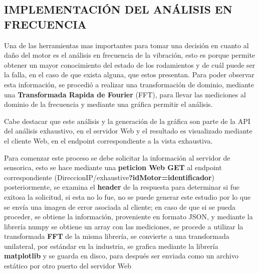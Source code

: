
\subsection{IMPLEMENTACIÓN DEL ANÁLISIS EN FRECUENCIA}

Una de las herramientas mas importantes para tomar una decisión en cuanto
al daño del motor es el análisis en frecuencia de la vibración, esto es porque
permite obtener un mayor conocimiento del estado de los rodamientos y de cuál
puede ser la falla, en el caso de que exista alguna, que estos presentan. Para
poder observar esta información, se procedió a realizar una transformación de
dominio, mediante una \textbf{Transformada Rapida de Fourier} (FFT), para
llevar las mediciones al dominio de la frecuencia
y mediante una gráfica permitir el análisis.

Cabe destacar que este análisis y la generación de la gráfica son parte de la
API del análisis exhaustivo, en el servidor Web y el resultado es visualizado
mediante el cliente Web, en el endpoint correspondiente a la vista exhaustiva.

Para comenzar este proceso se debe  solicitar la información al servidor de
sensorica, esto se hace mediante una \textbf{peticion Web GET} al endpoint
correspondiente (DireccionIP/exhaustive\textbf{?idMotor=identificador}) posteriormente,
se examina el \textbf{header} de la respuesta para determinar si fue exitosa
la solicitud, si esta no lo fue, no se puede generar este estudio por lo que se envía una
imagen de error asociada al cliente; en caso de que si se pueda proceder, se
obtiene la información, proveniente en formato JSON, y mediante la librería
numpy se obtiene un array con las mediciones, se procede a utilizar la transformada
\textbf{FFT} de la misma librería, se convierte a una transformada unilateral,
por estándar en la industria,  se grafica mediante la librería \textbf{matplotlib}
y se guarda en disco, para después ser enviada como un archivo estático por otro
puerto del servidor Web

